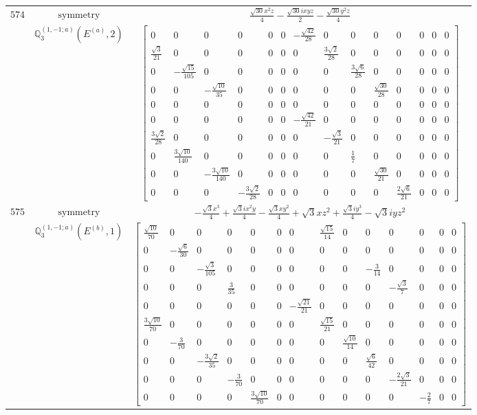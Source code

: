 \documentclass[fleqn,8pt,landscape]{jsarticle}
\begin{document}
\begin{longtable}{ccc}
$ 574 $ & $ \text{symmetry} $ & $ \frac{\sqrt{30} x^{2} z}{4} - \frac{\sqrt{30} i x y z}{2} - \frac{\sqrt{30} y^{2} z}{4} $ \\
$  $ & $ \mathbb{Q}_{3}^{(1,-1;a)}(E^{(a)},2) $ & $ \begin{bmatrix} 0 & 0 & 0 & 0 & 0 & 0 & - \frac{\sqrt{42}}{28} & 0 & 0 & 0 & 0 & 0 & 0 & 0 \\ \frac{\sqrt{3}}{21} & 0 & 0 & 0 & 0 & 0 & 0 & \frac{3 \sqrt{2}}{28} & 0 & 0 & 0 & 0 & 0 & 0 \\ 0 & - \frac{\sqrt{15}}{105} & 0 & 0 & 0 & 0 & 0 & 0 & \frac{3 \sqrt{6}}{28} & 0 & 0 & 0 & 0 & 0 \\ 0 & 0 & - \frac{\sqrt{10}}{35} & 0 & 0 & 0 & 0 & 0 & 0 & \frac{\sqrt{30}}{28} & 0 & 0 & 0 & 0 \\ 0 & 0 & 0 & 0 & 0 & 0 & 0 & 0 & 0 & 0 & 0 & 0 & 0 & 0 \\ 0 & 0 & 0 & 0 & 0 & 0 & - \frac{\sqrt{42}}{21} & 0 & 0 & 0 & 0 & 0 & 0 & 0 \\ \frac{3 \sqrt{2}}{28} & 0 & 0 & 0 & 0 & 0 & 0 & - \frac{\sqrt{3}}{21} & 0 & 0 & 0 & 0 & 0 & 0 \\ 0 & \frac{3 \sqrt{10}}{140} & 0 & 0 & 0 & 0 & 0 & 0 & \frac{1}{7} & 0 & 0 & 0 & 0 & 0 \\ 0 & 0 & - \frac{3 \sqrt{10}}{140} & 0 & 0 & 0 & 0 & 0 & 0 & \frac{\sqrt{30}}{21} & 0 & 0 & 0 & 0 \\ 0 & 0 & 0 & - \frac{3 \sqrt{2}}{28} & 0 & 0 & 0 & 0 & 0 & 0 & \frac{2 \sqrt{6}}{21} & 0 & 0 & 0 \end{bmatrix} $ \\ \hline
$ 575 $ & $ \text{symmetry} $ & $ - \frac{\sqrt{3} x^{3}}{4} + \frac{\sqrt{3} i x^{2} y}{4} - \frac{\sqrt{3} x y^{2}}{4} + \sqrt{3} x z^{2} + \frac{\sqrt{3} i y^{3}}{4} - \sqrt{3} i y z^{2} $ \\
$  $ & $ \mathbb{Q}_{3}^{(1,-1;a)}(E^{(b)},1) $ & $ \begin{bmatrix} \frac{\sqrt{10}}{70} & 0 & 0 & 0 & 0 & 0 & 0 & \frac{\sqrt{15}}{14} & 0 & 0 & 0 & 0 & 0 & 0 \\ 0 & - \frac{\sqrt{6}}{30} & 0 & 0 & 0 & 0 & 0 & 0 & 0 & 0 & 0 & 0 & 0 & 0 \\ 0 & 0 & - \frac{\sqrt{3}}{105} & 0 & 0 & 0 & 0 & 0 & 0 & - \frac{3}{14} & 0 & 0 & 0 & 0 \\ 0 & 0 & 0 & \frac{3}{35} & 0 & 0 & 0 & 0 & 0 & 0 & - \frac{\sqrt{3}}{7} & 0 & 0 & 0 \\ 0 & 0 & 0 & 0 & 0 & 0 & - \frac{\sqrt{21}}{21} & 0 & 0 & 0 & 0 & 0 & 0 & 0 \\ \frac{3 \sqrt{10}}{70} & 0 & 0 & 0 & 0 & 0 & 0 & \frac{\sqrt{15}}{21} & 0 & 0 & 0 & 0 & 0 & 0 \\ 0 & - \frac{3}{70} & 0 & 0 & 0 & 0 & 0 & 0 & \frac{\sqrt{10}}{14} & 0 & 0 & 0 & 0 & 0 \\ 0 & 0 & - \frac{3 \sqrt{2}}{35} & 0 & 0 & 0 & 0 & 0 & 0 & \frac{\sqrt{6}}{42} & 0 & 0 & 0 & 0 \\ 0 & 0 & 0 & - \frac{3}{70} & 0 & 0 & 0 & 0 & 0 & 0 & - \frac{2 \sqrt{3}}{21} & 0 & 0 & 0 \\ 0 & 0 & 0 & 0 & \frac{3 \sqrt{10}}{70} & 0 & 0 & 0 & 0 & 0 & 0 & - \frac{2}{7} & 0 & 0 \end{bmatrix} $ \\ \hline

\end{longtable}
\end{document}
